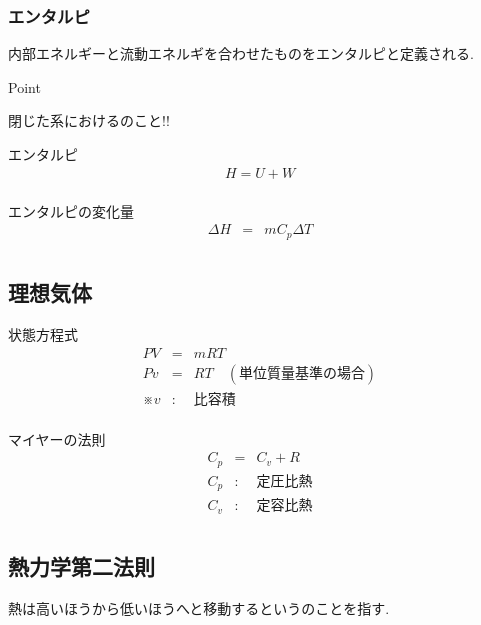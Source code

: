 \documentclass[a4paper]{jsarticle}
\begin{document}
\subsubsection{エンタルピ}
内部エネルギーと流動エネルギを合わせたものをエンタルピと定義される.
\begin{itembox}[l]{Point}
    \begin{center}
        閉じた系におけるのこと!!
    \end{center}
\end{itembox}
\begin{itembox}[l]{エンタルピ}
    \begin{eqnarray*}
        H=U+W\\
    \end{eqnarray*}
\end{itembox}
\begin{itembox}[l]{エンタルピの変化量}
    \begin{eqnarray*}
        \Delta H&=&mC_p\Delta T\\
    \end{eqnarray*}
\end{itembox}
\subsection{理想気体}
\begin{itembox}[l]{状態方程式}
    \begin{eqnarray*}
        PV&=&mRT\\
        Pv&=&RT\quad (単位質量基準の場合)\\
        ※v&:&比容積\\
    \end{eqnarray*}
\end{itembox}
\begin{itembox}[l]{マイヤーの法則}
    \begin{eqnarray*}
        C_p&=&C_v+R\\
        C_p&:&定圧比熱\\
        C_v&:&定容比熱\\
    \end{eqnarray*}
\end{itembox}
\subsection{熱力学第二法則}
\begin{screen}
    \begin{center}
        熱は高いほうから低いほうへと移動するというのことを指す.
    \end{center}
\end{screen}
\end{document}
